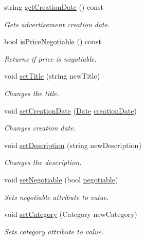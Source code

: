 \begin{DoxyCompactItemize}
string \hyperlink{class_advertisement_aae882e292b1ddcad797df1d4b4766073}{get\+Creation\+Date} () const 
\begin{DoxyCompactList}\small\item\em Gets advertisement creation date. \end{DoxyCompactList}\item 
bool \hyperlink{class_advertisement_a872ed609f23386fa5b26913a1d78036a}{is\+Price\+Negotiable} () const 
\begin{DoxyCompactList}\small\item\em Returns if price is negotiable. \end{DoxyCompactList}\item 
void \hyperlink{class_advertisement_a22bc67410075fb1d7121ebe641da460e}{set\+Title} (string new\+Title)
\begin{DoxyCompactList}\small\item\em Changes the title. \end{DoxyCompactList}\item 
void \hyperlink{class_advertisement_a6313190818f1e4177bedeab6077e8fd7}{set\+Creation\+Date} (\hyperlink{class_date}{Date} \hyperlink{class_advertisement_a1997017950120c6ed305d772baae32b2}{creation\+Date})
\begin{DoxyCompactList}\small\item\em Changes creation date. \end{DoxyCompactList}\item 
void \hyperlink{class_advertisement_acaf414adece9bb3ca2077354e15ab626}{set\+Description} (string new\+Description)
\begin{DoxyCompactList}\small\item\em Changes the description. \end{DoxyCompactList}\item 
void \hyperlink{class_advertisement_a99c97180458c86d517cbbf35d960994f}{set\+Negotiable} (bool \hyperlink{class_advertisement_a34021160ad144fefd9df9a30d19bd895}{negotiable})
\begin{DoxyCompactList}\small\item\em Sets negotiable attribute to value. \end{DoxyCompactList}\item 
void \hyperlink{class_advertisement_ad9ba4dc7b74aea1e4bdd12d60322453c}{set\+Category} (Category new\+Category)
\begin{DoxyCompactList}\small\item\em Sets category attribute to value. \end{DoxyCompactList}\item 

\end{DoxyCompactItemize}

